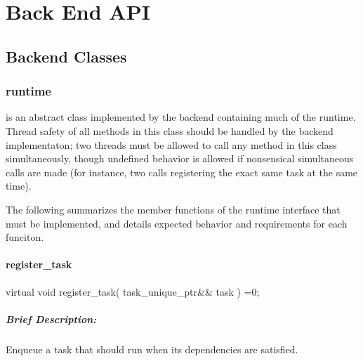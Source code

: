 \chapter{Back End API}
\label{chap:back_end}



\section{Backend Classes}
\subsection{{runtime}}
 is an abstract class implemented by the backend containing
much of the runtime.  Thread safety of all methods in this class should be handled by the backend implementaton;
two threads must  be allowed to call any method in this class simultaneously, though undefined behavior
is allowed if nonsensical simultaneous calls are made (for instance, two calls registering the exact same
task at the same time).

The following summarizes the member functions of the runtime interface that
must be implemented, and details expected behavior and requirements for each
funciton.

\subsubsection{register\_task}
\begin{CppCode}
virtual void register_task(
      task_unique_ptr&& task
    ) =0;
\end{CppCode}

\paragraph{Brief Description:} Enqueue a task that should run when its
dependencies are satisfied.
     
